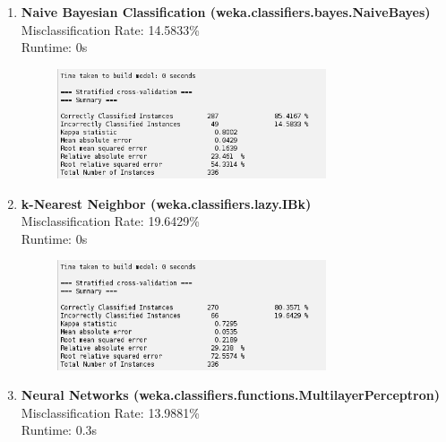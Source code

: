 \documentclass{article}
\begin{document}
\begin{enumerate}[label = (\alph*), left=10pt, itemsep=10pt]
\begin{minipage}[t]{0.9\textwidth}
        \end{minipage}
        \item \begin{minipage}[t]{0.9\textwidth}
            \textbf{Naive Bayesian Classification (weka.classifiers.bayes.NaiveBayes)}\\
             Misclassification Rate: 14.5833\%\\
             Runtime: 0s
             \begin{figure}[H]
                \includegraphics[width=0.75\textwidth, height=0.2\textheight]{./81c.png}
            \end{figure} 
        \end{minipage}
        \item \begin{minipage}[t]{0.9\textwidth}
            \textbf{k-Nearest Neighbor (weka.classifiers.lazy.IBk)}\\
             Misclassification Rate: 19.6429\%\\
             Runtime: 0s
             \begin{figure}[H]
                \includegraphics[width=0.75\textwidth, height=0.2\textheight]{./81d.png}
            \end{figure} 
        \end{minipage}
        \item \begin{minipage}[t]{0.9\textwidth}
            \textbf{Neural Networks (weka.classifiers.functions.MultilayerPerceptron)}\\
             Misclassification Rate: 13.9881\%\\
             Runtime: 0.3s
             \begin{figure}[H]

\end{figure}
\end{minipage}
\end{enumerate}
\end{document}
